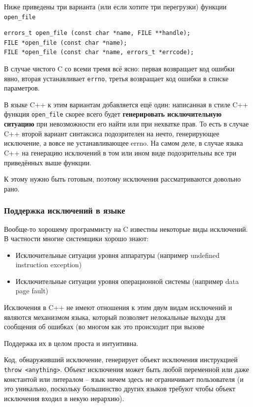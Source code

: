\documentclass[a4paper,12pt,oneside]{article}
\begin{document}
Ниже приведены три варианта (или если хотите три перегрузки) функции \lstinline!open_file!

\begin{lstlisting}
errors_t open_file (const char *name, FILE **handle);
FILE *open_file (const char *name);
FILE *open_file (const char *name, errors_t *errcode);
\end{lstlisting}

В случае чистого C со всеми тремя всё ясно: первая возвращает код ошибки явно, вторая устанавливает \lstinline!errno!, третья возвращает код ошибки в списке параметров.

В языке C++ к этим вариантам добавляется ещё один: написанная в стиле C++ функция \lstinline!open_file! скорее всего будет \textbf{генерировать исключительную ситуацию} при невозможности его найти или при нехватке прав. То есть в случае C++ второй вариант синтаксиса подозрителен на нечто, генерирующее исключение, а вовсе не устанавливающее errno. На самом деле, в случае языка C++ на генерацию исключений в том или ином виде подозрительны все три приведённых выше функции.

К этому нужно быть готовым, поэтому исключения рассматриваются довольно рано.

\subsubsection{Поддержка исключений в языке}\label{subsub:exceptionguide}

Вообще-то хорошему программисту на C известны некоторые виды исключений. В частности многие системщики хорошо знают:

\begin{itemize}
\item
Исключительные ситуации уровня аппаратуры (например undefined instruction exception)
\item
Исключительные ситуации уровня операционной системы (например data page fault)
\end{itemize}

Исключения в C++ не имеют отношения к этим двум видам исключений и являются механизмом языка, который позволяет нелокальные выходы для сообщения об ошибках (во многом как это происходит при вызове 

Поддержка их в целом проста и интуитивна.

Код, обнаруживший исключение, генерирует объект исключения инструкцией \lstinline!throw <anything>!. Объект исключения может быть любой переменной или даже константой или литералом -- язык ничем здесь не ограничивает пользователя (и это уникально, поскольку большинство других языков требуют чтобы объект исключения входил в некую иерархию). 
\end{document}
